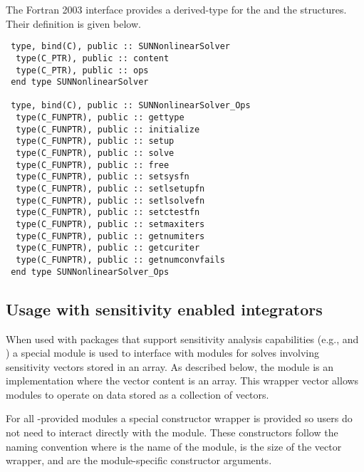 The Fortran 2003 interface provides a  derived-type for the
 and the  structures.
Their definition is given below.
\begin{verbatim}
 type, bind(C), public :: SUNNonlinearSolver
  type(C_PTR), public :: content
  type(C_PTR), public :: ops
 end type SUNNonlinearSolver

 type, bind(C), public :: SUNNonlinearSolver_Ops
  type(C_FUNPTR), public :: gettype
  type(C_FUNPTR), public :: initialize
  type(C_FUNPTR), public :: setup
  type(C_FUNPTR), public :: solve
  type(C_FUNPTR), public :: free
  type(C_FUNPTR), public :: setsysfn
  type(C_FUNPTR), public :: setlsetupfn
  type(C_FUNPTR), public :: setlsolvefn
  type(C_FUNPTR), public :: setctestfn
  type(C_FUNPTR), public :: setmaxiters
  type(C_FUNPTR), public :: getnumiters
  type(C_FUNPTR), public :: getcuriter
  type(C_FUNPTR), public :: getnumconvfails
 end type SUNNonlinearSolver_Ops
\end{verbatim}


\subsection{Usage with sensitivity enabled integrators}
\label{ss:sunnonlinsol_sens}

When used with {\sundials} packages that support sensitivity analysis
capabilities (e.g., {\cvodes} and {\idas}) a special {\nvector} module is used
to interface with {\sunnonlinsol} modules for solves involving sensitivity
vectors stored in an {\nvector} array. As described below, the {\nvecwrap}
module is an {\nvector} implementation where the vector content is an {\nvector}
array. This wrapper vector allows {\sunnonlinsol} modules to operate on data
stored as a collection of vectors.

For all {\sundials}-provided {\sunnonlinsol} modules a special constructor
wrapper is provided so users do not need to interact directly with the
{\nvecwrap} module. These constructors follow the naming
convention  where \id{***} is the name of
the {\sunnonlinsol} module,  is the size of the vector wrapper,
and  are the module-specific constructor arguments. 

